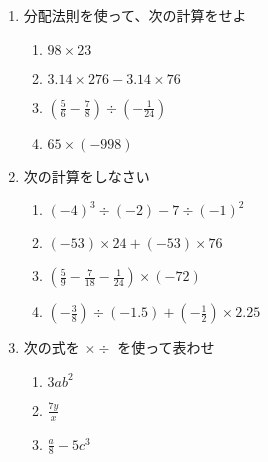 \documentclass[twocolumn, fleqn]{jsarticle}
\begin{document}



  \begin{enumerate}
    \item 分配法則を使って、次の計算をせよ 

      \begin{enumerate}
        \item  $ 98 \times 23$
          \vfill
        \item  $ 3.14 \times 276 - 3.14 \times 76$
          \vfill
        \item  $(\frac{5}{6} - \frac{7}{8}) \div (- \frac{1}{24})$
          \vfill
        \item $65 \times (-998)$
          \vfill
      \end{enumerate}

      \item 次の計算をしなさい
        \begin{enumerate}
          \item $ (-4)^3 \div (-2) -7 \div (-1)^2$
            \vfill

        \item $(-53) \times 24 + (-53) \times 76$
          \vfill
        \item $( \frac{5}{9}- \frac{7}{18} -\frac{1}{24}) \times (-72)$
          \vfill
        \item $(- \frac{3}{8}) \div(-1.5) + (-\frac{1}{2}) \times 2.25$
          \vfill
      \end{enumerate}

    \newpage
    \item 次の式を $ \times \div $ を使って表わせ
      \begin{enumerate}
          \item $3ab^2$
            \vfill
          \item $ \frac{7y}{x} $
            \vfill
          \item $ \frac{a}{8} - 5c^3$
            \vfill
        \end{enumerate}
              

\end{enumerate}
\end{document}
